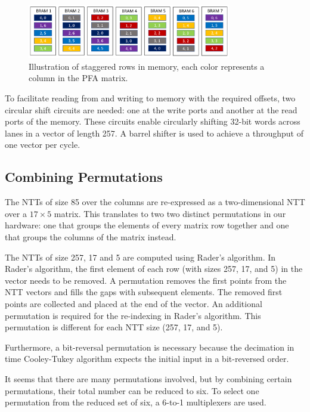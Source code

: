 \documentclass[lettersize,journal]{IEEEtran}
\begin{document}
\begin{figure}[H]
\centering
\includegraphics[width=3.5in]{img/staggered_memory.png}
\caption{Illustration of staggered rows in memory, each color represents a column in the PFA matrix.}
\label{fig:staggered_memory}
\end{figure}

To facilitate reading from and writing to memory with the required offsets, two circular shift circuits are needed: one at the write ports and another at the read ports of the memory. These circuits enable circularly shifting 32-bit words across lanes in a vector of length 257. A barrel shifter is used to achieve a throughput of one vector per cycle.

\subsection{Combining Permutations}
The NTTs of size 85 over the columns are re-expressed as a two-dimensional NTT over a $17\times 5$ matrix. This translates to two two distinct permutations in our hardware: one that groups the elements of every matrix row together and one that groups the columns of the matrix instead.

The NTTs of size 257, 17 and 5 are computed using Rader's algorithm. In Rader's algorithm, the first element of each row (with sizes 257, 17, and 5) in the vector needs to be removed. A permutation removes the first points from the NTT vectors and fills the gaps with subsequent elements. The removed first points are collected and placed at the end of the vector. An additional permutation is required for the re-indexing in Rader's algorithm. This permutation is different for each NTT size (257, 17, and 5).

Furthermore, a bit-reversal permutation is necessary because the decimation in time Cooley-Tukey algorithm expects the initial input in a bit-reversed order.

It seems that there are many permutations involved, but by combining certain permutations, their total number can be reduced to six. To select one permutation from the reduced set of six, a 6-to-1 multiplexers are used.
\end{document}
